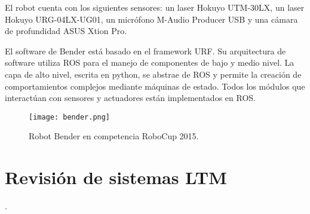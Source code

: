El robot cuenta con los siguientes sensores: un laser Hokuyo UTM-30LX, un laser Hokuyo URG-04LX-UG01, un micrófono M-Audio Producer USB y una cámara de profundidad ASUS Xtion Pro.

El software de Bender está basado en el framework URF. Su arquitectura de software utiliza  ROS para el manejo de componentes de bajo y medio nivel. La capa de alto nivel, escrita en python, se abstrae de ROS y permite la creación de comportamientos complejos mediante máquinas de estado. Todos los módulos que interactúan con sensores y actuadores están implementados en ROS.

\begin{figure}[!h]
	\centering
	\texttt{[image: bender.png]}
	\caption{\small Robot Bender en competencia RoboCup 2015.}
	\label{img:bender}
\end{figure}



%




\section{Revisión de sistemas LTM}
.


